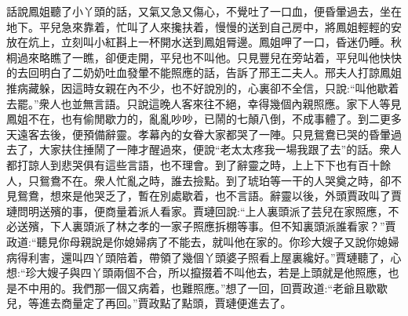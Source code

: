 


\begin{parag}
    話說鳳姐聽了小丫頭的話，又氣又急又傷心，不覺吐了一口血，便昏暈過去，坐在地下。平兒急來靠着，忙叫了人來攙扶着，慢慢的送到自己房中，將鳳姐輕輕的安放在炕上，立刻叫小紅斟上一杯開水送到鳳姐脣邊。鳳姐呷了一口，昏迷仍睡。秋桐過來略瞧了一瞧，卻便走開，平兒也不叫他。只見豐兒在旁站着，平兒叫他快快的去回明白了二奶奶吐血發暈不能照應的話，告訴了邢王二夫人。邢夫人打諒鳳姐推病藏躲，因這時女親在內不少，也不好說別的，心裏卻不全信，只說:“叫他歇着去罷。”衆人也並無言語。只說這晚人客來往不絕，幸得幾個內親照應。家下人等見鳳姐不在，也有偷閒歇力的，亂亂吵吵，已鬧的七顛八倒，不成事體了。到二更多天遠客去後，便預備辭靈。孝幕內的女眷大家都哭了一陣。只見鴛鴦已哭的昏暈過去了，大家扶住捶鬧了一陣才醒過來，便說“老太太疼我一場我跟了去”的話。衆人都打諒人到悲哭俱有這些言語，也不理會。到了辭靈之時，上上下下也有百十餘人，只鴛鴦不在。衆人忙亂之時，誰去撿點。到了琥珀等一干的人哭奠之時，卻不見鴛鴦，想來是他哭乏了，暫在別處歇着，也不言語。辭靈以後，外頭賈政叫了賈璉問明送殯的事，便商量着派人看家。賈璉回說:“上人裏頭派了芸兒在家照應，不必送殯，下人裏頭派了林之孝的一家子照應拆棚等事。但不知裏頭派誰看家？”賈政道:“聽見你母親說是你媳婦病了不能去，就叫他在家的。你珍大嫂子又說你媳婦病得利害，還叫四丫頭陪着，帶領了幾個丫頭婆子照看上屋裏纔好。”賈璉聽了，心想:“珍大嫂子與四丫頭兩個不合，所以攛掇着不叫他去，若是上頭就是他照應，也是不中用的。我們那一個又病着，也難照應。”想了一回，回賈政道:“老爺且歇歇兒，等進去商量定了再回。”賈政點了點頭，賈璉便進去了。
\end{parag}


